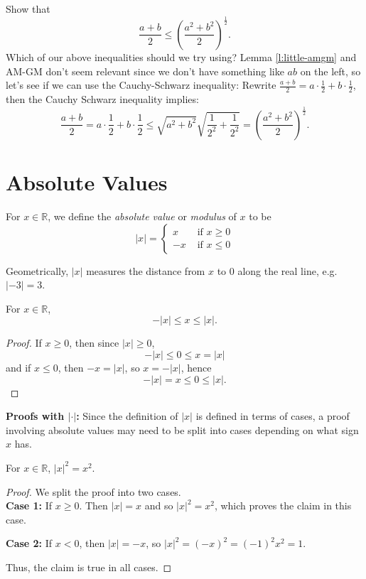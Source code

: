 \documentclass[11pt,dvipsnames]{book}
\numberwithin{figure}{section} %
\numberwithin{table}{section} %
\begin{document}
\begin{example} Show that
\[
\frac{a+b}{2} \leq \left(\frac{a^2+b^2}{2}\right)^{\frac{1}{2}}.
\]
Which of our above inequalities should we try using? Lemma \ref{l:little-amgm} and AM-GM don't seem relevant since we don't have something like $ab$ on the left, so let's see if we can use the Cauchy-Schwarz inequality: Rewrite $\frac{a+b}{2}=a\cdot \frac{1}{2} +b\cdot\frac{1}{2}$, then the Cauchy Schwarz inequality implies:
\[
\frac{a+b}{2} = a\cdot\frac{1}{2} + b\cdot\frac{1}{2} \leq \sqrt{a^2+b^2}\sqrt{\frac{1}{2^{2}}+\frac{1}{2^{2}}}
=\left(\frac{a^2+b^2}{2}\right)^{\frac{1}{2}}.
\]
\end{example}
\section{Absolute Values}

\begin{definition}
For $x\in \mathbb{R}$, we define the {\it absolute value} or {\it modulus} of $x$ to be
\[
|x| = \left\{\begin{array}{ll} x & \mbox{ if } x\geq 0 \\ -x & \mbox{ if } x\leq 0 \end{array}\right.
\]
\end{definition}

Geometrically, $|x|$ measures the distance from $x$ to $0$ along the real line, e.g. $|-3|=3$.

\begin{lemma}
For $x\in\mathbb{R}$,
\[
-|x|\leq x\leq |x|.
\]
\end{lemma}
\begin{proof}
If $x\geq 0$, then since $|x|\geq 0$,
\[
-|x|\leq 0\leq x=|x|
\]
and if $x\leq 0$, then $-x=|x|$, so $x=-|x|$, hence
\[
-|x|=x\leq 0\leq |x|.
\]
\end{proof}

\begin{protip}
{\bf Proofs with $|\cdot|$:} Since the definition of $|x|$ is defined in terms of cases, a proof involving absolute values may need to be split into cases depending on what sign $x$ has.
\end{protip}

\begin{example}
\label{ex:|x|^2=x^2}
For $x\in \mathbb{R}$, $|x|^2=x^2$.

\begin{proof}
We split the proof into two cases. \\

{\bf Case 1:} If $x\geq 0$. Then $|x|=x$ and so $|x|^2=x^2$, which proves the claim in this case.

{\bf Case 2:} If $x<0$, then $|x|=-x$, so $|x|^2=(-x)^2=(-1)^2x^2=1$.

 Thus, the claim is true in all cases.

\end{proof}
\end{example}
\end{document}

